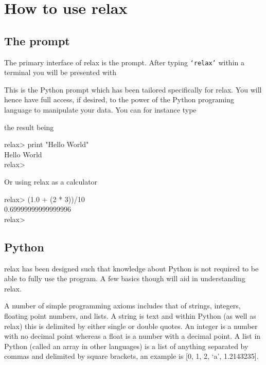 
\chapter{How to use relax}



\section{The prompt}

The primary interface of relax is the prompt.  After typing \texttt{`relax'} within a terminal you will be presented with


This is the Python prompt which has been tailored specifically for relax.  You will hence have full access, if desired, to the power of the Python programing language to manipulate your data.  You can for instance type


the result being

\begin{exampleenv}
relax> print "Hello World" \\
Hello World \\
relax>
\end{exampleenv}

Or using relax as a calculator

\begin{exampleenv}
relax> (1.0 + (2 * 3))/10 \\
0.69999999999999996 \\
relax>
\end{exampleenv}




\section{Python}

relax has been designed such that knowledge about Python is not required to be able to fully use the program.  A few basics though will aid in understanding relax.

A number of simple programming axioms includes that of strings, integers, floating point numbers, and lists.  A string is text and within Python (as well as relax) this is delimited by either single or double quotes.  An integer is a number with no decimal point whereas a float is a number with a decimal point.  A list in Python (called an array in other languages) is a list of anything separated by commas and delimited by square brackets, an example is [0, 1, 2, `a', 1.2143235].

